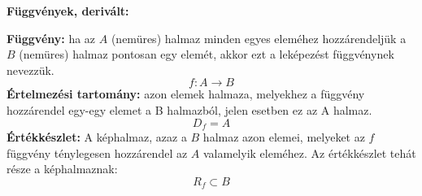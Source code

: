 \documentclass[11pt,a4paper]{article}
\begin{document}
\textbf{Függvények, derivált:}

\begin{tcolorbox}[colback=green!5!white,colframe=green!60!black,title= 1. Függvények{,} értelmezési tartomány{,} értékkészlet]
        \textbf{Függvény:} ha az \(A\) (nemüres) halmaz minden egyes eleméhez hozzárendeljük a \(B\)
        (nemüres) halmaz pontosan egy elemét, akkor ezt a leképezést függvénynek nevezzük.
        $$f:A \to B$$
        \textbf{Értelmezési tartomány:} azon elemek halmaza, melyekhez a függvény hozzárendel
        egy-egy elemet a B halmazból, jelen esetben ez az A halmaz.
        $$D_f = A$$
        \textbf{Értékkészlet:} A képhalmaz, azaz a \(B\) halmaz azon elemei, melyeket az \(f\) függvény
        ténylegesen hozzárendel az \(A\) valamelyik eleméhez. Az értékkészlet tehát része a képhalmaznak:
        $$R_f \subset B$$
\end{tcolorbox}
\end{document}
